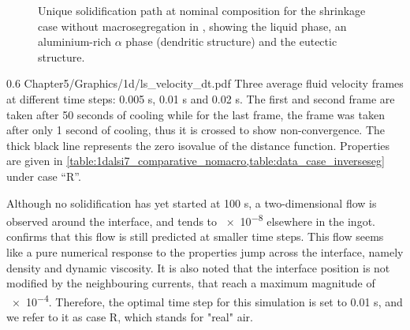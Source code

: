 \begin{figure}[htbp]
\centering
{}

\caption{Unique solidification path at nominal composition for the shrinkage case without macrosegregation in ,
showing the liquid phase, an aluminium-rich $\alpha$ phase (dendritic structure) and the eutectic structure.}
\label{fig:shrinkage_nomacro_sp}
\end{figure}


\begin{figureth}
{0.6}
{Chapter5/Graphics/1d/ls_velocity_dt.pdf}
{Three average fluid velocity frames at different time steps: 0.005 s, 0.01 s and 0.02 s. The first and second frame are taken after 
50 seconds of cooling while for the last frame, the frame was taken after only 1 second of cooling, thus it is crossed to show non-convergence.
The thick black line represents the zero isovalue of the distance function. Properties are given in \cref{table:1dalsi7_comparative_nomacro,table:data_case_inverseseg}
under case ``R''.}
\label{fig:1dalsi7_velocity_dt}
\end{figureth}

Although no solidification has yet started at 100 s, a two-dimensional flow is observed around the interface, and tends to \SI{e-8}{\uvelocity} elsewhere in the ingot.
 confirms that this flow is still predicted at smaller time steps. This flow seems like a pure numerical response
to the properties jump across the interface, namely density and dynamic viscosity. It is also noted that the interface position
is not modified by the neighbouring currents, that reach a maximum magnitude of \SI{e-4}{\uvelocity}. 
Therefore, the optimal time step for this simulation is set to 0.01 s, and we refer to it as case R, which stands for "real" air.


